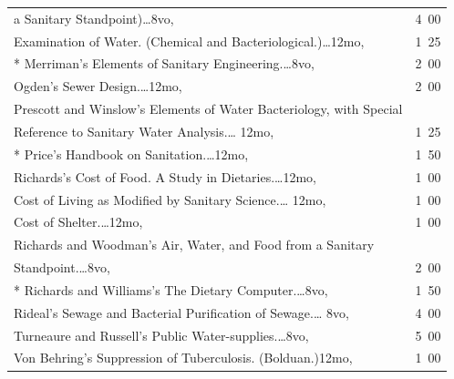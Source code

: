 \documentclass[a4paper,12pt]{book}[2004/02/16]
\theoremstyle{ilemma}
\theoremstyle{itheorem}
\theoremstyle{iother}
\theoremstyle{icorollary}
\theoremstyle{numcorollary}
\theoremstyle{idefinition}
\begin{document}
\begin{longtable}{@{}l@{ }r@{}}
\nopagebreak

\indent\indent a Sanitary Standpoint)\dotfill\ldots 8vo, & 4\ 00\\

\indent Examination of Water. (Chemical and
Bacteriological.)\dotfill\ldots 12mo, & 1\ 25\\

* Merriman's Elements of Sanitary Engineering.\dotfill\ldots 8vo, & 2\ 00\\

Ogden's Sewer Design.\dotfill\ldots 12mo, & 2\ 00\\

Prescott and Winslow's Elements of Water Bacteriology, with Special\\

\indent\indent Reference to Sanitary Water Analysis.\dotfill\ldots
12mo, & 1\ 25\\

* Price's Handbook on Sanitation.\dotfill\ldots 12mo, & 1\ 50\\

Richards's Cost of Food. A Study in Dietaries.\dotfill\ldots 12mo, & 1\ 00\\

\indent Cost of Living as Modified by Sanitary Science.\dotfill\ldots
12mo, & 1\ 00\\

\indent Cost of Shelter.\dotfill\ldots 12mo, & 1\ 00\\



Richards and Woodman's Air, Water, and Food from a Sanitary\\

\nopagebreak

\indent\indent Standpoint.\dotfill\ldots 8vo, &2\ 00\\

* Richards and Williams's The Dietary Computer.\dotfill\ldots 8vo, &1\ 50\\

Rideal's Sewage and Bacterial Purification of Sewage.\dotfill\ldots
8vo, &4\ 00\\

Turneaure and Russell's Public Water-supplies.\dotfill\ldots 8vo, &5\ 00\\

Von Behring's Suppression of Tuberculosis. (Bolduan.)\dotfill 12mo, &1\ 00\\


\end{longtable}
\end{document}
